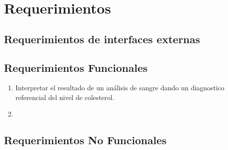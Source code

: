\chapter{Requerimientos}

\section{Requerimientos de interfaces externas}

\section{Requerimientos Funcionales}



\begin{enumerate}
	\item Interpretar el resultado de un análisis de sangre  dando un diagnostico referencial del nivel de colesterol.
	\item 
\end{enumerate}

\section{Requerimientos No Funcionales}
